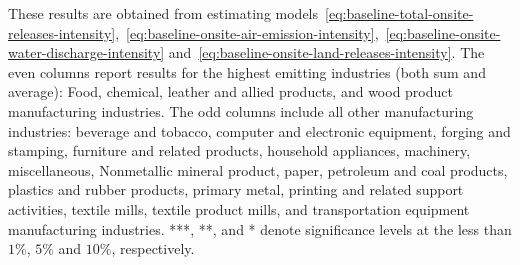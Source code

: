 \begin{table}[H]
\begin{minipage}{18cm}
        \tiny These results are obtained from estimating models~\ref{eq:baseline-total-onsite-releases-intensity},~\ref{eq:baseline-onsite-air-emission-intensity},~\ref{eq:baseline-onsite-water-discharge-intensity} and~\ref{eq:baseline-onsite-land-releases-intensity}. The even columns report results for the highest emitting industries (both sum and average): Food, chemical, leather and allied products, and wood product manufacturing industries. The odd columns include all other manufacturing industries: beverage and tobacco, computer and electronic equipment, forging and stamping, furniture and related products, household appliances, machinery, miscellaneous, Nonmetallic mineral product, paper, petroleum and coal products, plastics and rubber products, primary metal, printing and related support activities, textile mills, textile product mills, and transportation equipment manufacturing industries. ***, **, and * denote significance levels at the less than $1\%$, $5\%$ and $10\%$, respectively.
    \end{minipage}
\end{table}